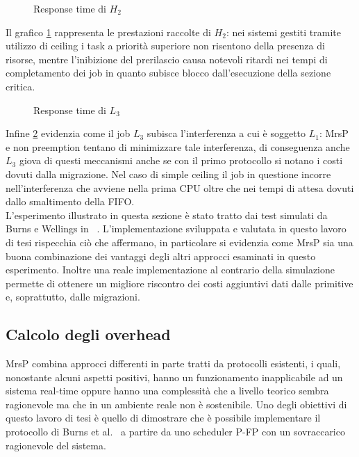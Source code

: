 \begin{figure}
  \centering
  \confrontoProtocolliHDue
  \caption{Response time di $H_2$}
  \label{fig:test_protocols_H2}
\end{figure}

\noindent Il grafico \ref{fig:test_protocols_H2} rappresenta le prestazioni raccolte di $H_2$: nei sistemi gestiti tramite utilizzo di ceiling i task a priorità superiore non risentono della presenza di risorse, mentre l'inibizione del prerilascio causa notevoli ritardi nei tempi di completamento dei job in quanto subisce blocco dall'esecuzione della sezione critica.\\

\begin{figure}
  \centering
  \confrontoProtocolliLTre
  \caption{Response time di $L_3$}
  \label{fig:test_protocols_L3}
\end{figure}

\noindent Infine \ref{fig:test_protocols_L3} evidenzia come il job $L_3$ subisca l'interferenza a cui è soggetto $L_1$: MrsP e non preemption tentano di minimizzare tale interferenza, di conseguenza anche $L_3$ giova di questi meccanismi anche se con il primo protocollo si notano i costi dovuti dalla migrazione. Nel caso di simple ceiling il job in questione incorre nell'interferenza che avviene nella prima CPU oltre che nei tempi di attesa dovuti dallo smaltimento della FIFO.\\

\noindent L'esperimento illustrato in questa sezione è stato tratto dai test simulati da Burns e Wellings in ~\cite{Burns:2013:SCM:2547348.2547350}. L'implementazione sviluppata e valutata in questo lavoro di tesi rispecchia ciò che affermano, in particolare si evidenzia come MrsP sia una buona combinazione dei vantaggi degli altri approcci esaminati in questo esperimento. Inoltre una reale implementazione al contrario della simulazione permette di ottenere un migliore riscontro dei costi aggiuntivi dati dalle primitive e, soprattutto, dalle migrazioni.\\

\newpage

\subsection{Calcolo degli overhead}
\label{sec:overhead}

\noindent MrsP combina approcci differenti in parte tratti da protocolli esistenti, i quali, nonostante alcuni aspetti positivi, hanno un funzionamento inapplicabile ad un sistema real-time oppure hanno una complessità che a livello teorico sembra ragionevole ma che in un ambiente reale non è sostenibile. Uno degli obiettivi di questo lavoro di tesi è quello di dimostrare che è possibile implementare il protocollo di Burns et al.~\cite{Burns:2013:SCM:2547348.2547350} a partire da uno scheduler P-FP con un sovraccarico ragionevole del sistema.


